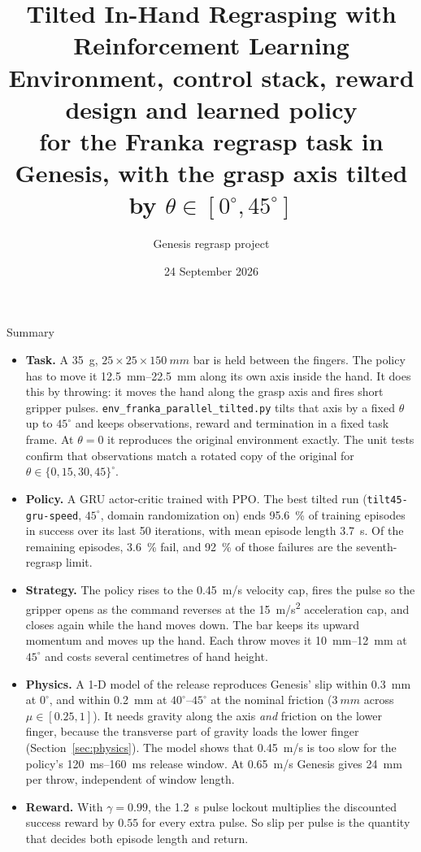 \documentclass[10.5pt,a4paper]{article}
\title{\textbf{Tilted In-Hand Regrasping with Reinforcement Learning}\\[3pt]
\large Environment, control stack, reward design and learned policy\\
for the Franka regrasp task in Genesis, with the grasp axis tilted by $\theta\in[0^\circ,45^\circ]$}
\author{Genesis regrasp project}
\date{24 September 2026}
\newcommand{\code}[1]{\texttt{#1}}
\begin{document}
\maketitle

\begin{keybox}{Summary}
\begin{itemize}[leftmargin=12pt]
\item \textbf{Task.} A \SI{35}{g}, $25\times25\times\SI{150}{mm}$ bar is held between the fingers. The policy has to
move it \SIrange{12.5}{22.5}{mm} along its own axis inside the hand. It does this by throwing: it moves the hand
along the grasp axis and fires short gripper pulses. \code{env\_franka\_parallel\_tilted.py} tilts that axis by a
fixed $\theta$ up to $45^\circ$ and keeps observations, reward and termination in a fixed task frame. At
$\theta=0$ it reproduces the original environment exactly. The unit tests confirm that observations match a
rotated copy of the original for $\theta\in\{0,15,30,45\}^\circ$.
\item \textbf{Policy.} A GRU actor-critic trained with PPO. The best tilted run (\code{tilt45-gru-speed},
$45^\circ$, domain randomization on) ends \SI{95.6}{\%} of training episodes in success over its last 50
iterations, with mean episode length \SI{3.7}{s}. Of the remaining episodes, \SI{3.6}{\%} fail, and
\SI{92}{\%} of those failures are the seventh-regrasp limit.
\item \textbf{Strategy.} The policy rises to the \SI{0.45}{m/s} velocity cap, fires the pulse so the gripper opens
as the command reverses at the \SI{15}{m/s^2} acceleration cap, and closes again while the hand moves down.
The bar keeps its upward momentum and moves up the hand. Each throw moves it \SIrange{10}{12}{mm} at
$45^\circ$ and costs several centimetres of hand height.
\item \textbf{Physics.} A 1-D model of the release reproduces Genesis' slip within \SI{0.3}{mm} at $0^\circ$, and
within \SI{0.2}{mm} at $40^\circ$--$45^\circ$ at the nominal friction ($\SI{3}{mm}$ across $\mu\in[0.25,1]$). It needs gravity along the axis \emph{and} friction on the lower finger,
because the transverse part of gravity loads the lower finger (Section~\ref{sec:physics}). The model shows that
\SI{0.45}{m/s} is too slow for the policy's \SIrange{120}{160}{ms} release window. At \SI{0.65}{m/s} Genesis gives
\SI{24}{mm} per throw, independent of window length.
\item \textbf{Reward.} With $\gamma=0.99$, the \SI{1.2}{s} pulse lockout multiplies the discounted success reward by
$0.55$ for every extra pulse. So slip per pulse is the quantity that decides both episode length and return.
\end{itemize}
\end{keybox}
\end{document}
